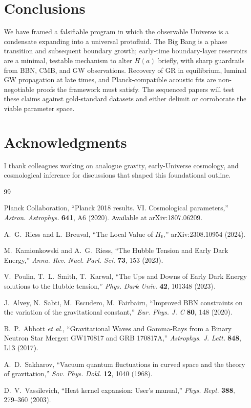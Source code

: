 \documentclass[11pt,a4paper]{article}
\begin{document}
\section{Conclusions}
We have framed a falsifiable program in which the observable Universe is a condensate expanding into a universal protofluid. The Big Bang is a phase transition and subsequent boundary growth; early-time boundary-layer reservoirs are a minimal, testable mechanism to alter $H(a)$ briefly, with sharp guardrails from BBN, CMB, and GW observations. Recovery of GR in equilibrium, luminal GW propagation at late times, and Planck-compatible acoustic fits are non-negotiable proofs the framework must satisfy. The sequenced papers will test these claims against gold-standard datasets and either delimit or corroborate the viable parameter space.

\section*{Acknowledgments}
I thank colleagues working on analogue gravity, early-Universe cosmology, and cosmological inference for discussions that shaped this foundational outline.

\begin{thebibliography}{99}\setlength{\itemsep}{2pt}

Planck Collaboration, ``Planck 2018 results. VI. Cosmological parameters,'' \emph{Astron. Astrophys.} \textbf{641}, A6 (2020). Available at arXiv:1807.06209.

A.~G.~Riess and L.~Breuval, ``The Local Value of $H_0$,'' arXiv:2308.10954 (2024).

M.~Kamionkowski and A.~G.~Riess, ``The Hubble Tension and Early Dark Energy,'' \emph{Annu. Rev. Nucl. Part. Sci.} \textbf{73}, 153 (2023).

V.~Poulin, T.~L.~Smith, T.~Karwal, ``The Ups and Downs of Early Dark Energy solutions to the Hubble tension,'' \emph{Phys. Dark Univ.} \textbf{42}, 101348 (2023).

J.~Alvey, N.~Sabti, M.~Escudero, M.~Fairbairn, ``Improved BBN constraints on the variation of the gravitational constant,'' \emph{Eur. Phys. J. C} \textbf{80}, 148 (2020).

B.~P.~Abbott \emph{et al.}, ``Gravitational Waves and Gamma-Rays from a Binary Neutron Star Merger: GW170817 and GRB 170817A,'' \emph{Astrophys. J. Lett.} \textbf{848}, L13 (2017).

A.~D.~Sakharov, ``Vacuum quantum fluctuations in curved space and the theory of gravitation,'' \emph{Sov. Phys. Dokl.} \textbf{12}, 1040 (1968).

D.~V.~Vassilevich, ``Heat kernel expansion: User's manual,'' \emph{Phys. Rept.} \textbf{388}, 279--360 (2003).

\end{thebibliography}
\end{document}

